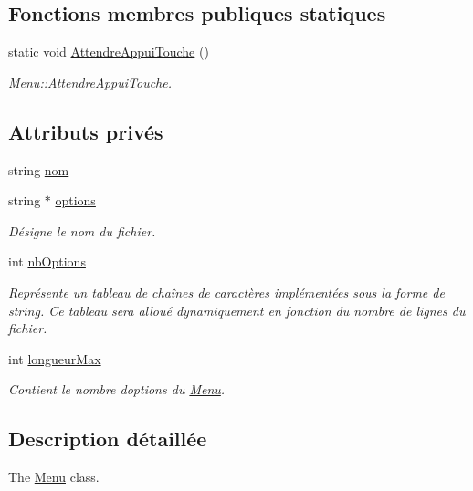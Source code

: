 \subsection*{Fonctions membres publiques statiques}
\begin{DoxyCompactItemize}
\item 
static void \hyperlink{class_menu_a6ddcaabf2fedb30f5136f3be655d60ce}{Attendre\+Appui\+Touche} ()
\begin{DoxyCompactList}\small\item\em \hyperlink{class_menu_a6ddcaabf2fedb30f5136f3be655d60ce}{Menu\+::\+Attendre\+Appui\+Touche}. \end{DoxyCompactList}\end{DoxyCompactItemize}
\subsection*{Attributs privés}
\begin{DoxyCompactItemize}
\item 
string \hyperlink{class_menu_a99574cb51606811f697854859bc1ccc1}{nom}
\item 
string $\ast$ \hyperlink{class_menu_aec975cfea9216420d5754ce2e9321390}{options}
\begin{DoxyCompactList}\small\item\em Désigne le nom du fichier. \end{DoxyCompactList}\item 
int \hyperlink{class_menu_ad59953635d184fefcddf95015a761187}{nb\+Options}
\begin{DoxyCompactList}\small\item\em Représente un tableau de chaînes de caractères implémentées sous la forme de string. Ce tableau sera alloué dynamiquement en fonction du nombre de lignes du fichier. \end{DoxyCompactList}\item 
int \hyperlink{class_menu_a745c540589015b573d8214e1080e2a8e}{longueur\+Max}
\begin{DoxyCompactList}\small\item\em Contient le nombre d\textquotesingle{}options du \hyperlink{class_menu}{Menu}. \end{DoxyCompactList}\end{DoxyCompactItemize}


\subsection{Description détaillée}
The \hyperlink{class_menu}{Menu} class. 

